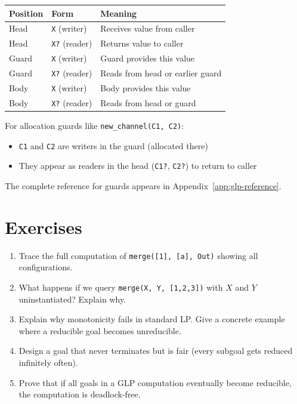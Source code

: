\begin{center}
\begin{tabular}{lll}
\textbf{Position} & \textbf{Form} & \textbf{Meaning} \\
\hline
Head & \verb|X| (writer) & Receives value from caller \\
Head & \verb|X?| (reader) & Returns value to caller \\
Guard & \verb|X| (writer) & Guard provides this value \\
Guard & \verb|X?| (reader) & Reads from head or earlier guard \\
Body & \verb|X| (writer) & Body provides this value \\
Body & \verb|X?| (reader) & Reads from head or guard \\
\end{tabular}
\end{center}

For allocation guards like \verb|new_channel(C1, C2)|:
\begin{itemize}
\item \verb|C1| and \verb|C2| are writers in the guard (allocated there)
\item They appear as readers in the head (\verb|C1?|, \verb|C2?|) to return to caller
\end{itemize}

The complete reference for guards appears in Appendix~\ref{app:glp-reference}.

\section{Exercises}

\begin{enumerate}
\item Trace the full computation of \verb|merge([1], [a], Out)| showing all configurations.

\item What happens if we query \verb|merge(X, Y, [1,2,3])| with $X$ and $Y$ uninstantiated? Explain why.

\item Explain why monotonicity fails in standard LP. Give a concrete example where a reducible goal becomes unreducible.

\item Design a goal that never terminates but is fair (every subgoal gets reduced infinitely often).

\item Prove that if all goals in a GLP computation eventually become reducible, the computation is deadlock-free.
\end{enumerate}
